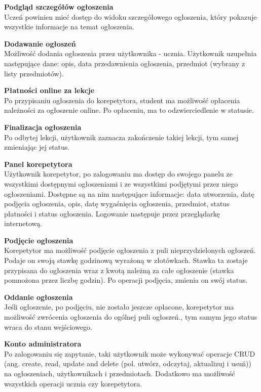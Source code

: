 \documentclass[12pt]{article}
\numberwithin{figure}{section}
\begin{document}
\begin{sloppypar}
\noindent
\textbf{Podgląd szczegółów ogłoszenia}\\
\indent
Uczeń powinien mieć dostęp do widoku szczegółowego ogłoszenia, który pokazuje wszystkie informacje na temat ogłoszenia.

\noindent
\textbf{Dodawanie ogłoszeń}\\
\indent
Możliwość dodania ogłoszenia przez użytkownika - ucznia. Użytkownik uzupełnia następujące dane: opis, data przedawnienia ogłoszenia, przedmiot (wybrany z listy przedmiotów). 

\noindent
\textbf{Płatności online za lekcje}\\
\indent
Po przypisaniu ogłoszenia do korepetytora, student ma możliwość opłacenia należności za ogłoszenie online. Po opłaceniu, ma to odzwierciedlenie w statusie. 

\noindent
\textbf{Finalizacja ogłoszenia}\\
\indent
Po odbytej lekcji, użytkownik zaznacza zakończenie takiej lekcji, tym samej zmieniając jej status.

\noindent
\textbf{Panel korepetytora}\\
\indent
Użytkownik korepetytor, po zalogowaniu ma dostęp do swojego panelu ze wszystkimi dostępnymi ogłoszeniami i ze wszystkimi podjętymi przez niego ogłoszeniami. Dostępne są na nim następujące informacje: data utworzenia, datę podjęcia ogłoszenia, opis, datę wygaśnięcia ogłoszenia, przedmiot, status płatności i status ogłoszenia. Logowanie następuje przez przeglądarkę internetową. 

\noindent
\textbf{Podjęcie ogłoszenia}\\
\indent
Korepetytor ma możliwość podjęcie ogłoszenia z puli nieprzydzielonych ogłoszeń. Podaje on swoją stawkę godzinową wyrażoną w złotówkach. Stawka ta zostaje przypisana do ogłoszenia wraz z kwotą należną za całe ogłoszenie (stawka pomnożona przez liczbę godzin). Po operacji podjęcia, zmienia on swój status.

\noindent
\textbf{Oddanie ogłoszenia}\\
\indent
Jeśli ogłoszenie, po podjęciu, nie zostało jeszcze opłacone, korepetytor ma możliwość zwrócenia ogłoszenia do ogólnej puli ogłoszeń., tym samym jego status wraca do stanu wejściowego. 

\noindent
\textbf{Konto administratora}\\
\indent
Po zalogowaniu się zapytanie, taki użytkownik może wykonywać operacje CRUD (ang. create, read, update and delete (pol. utwórz, odczytaj, aktualizuj i usuń)) na ogłoszeniach, użytkownikach i przedmiotach. Dodatkowo ma możliwość wszystkich operacji ucznia czy korepetytora.


\end{sloppypar}
\end{document}
